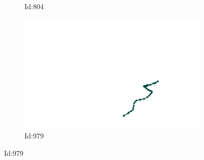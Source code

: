 \documentclass[12pt,twoside]{report}
\begin{document}
\begin{figure}
\begin{subfigure}[b]{0.20\textwidth}
\caption{Id:804}
\end{subfigure}
\begin{subfigure}[b]{0.20\textwidth}
\centering
\includegraphics[width=\textwidth]{../../trajectories/979.png}
\caption{Id:979}
\end{subfigure}
\end{figure}
\end{document}
